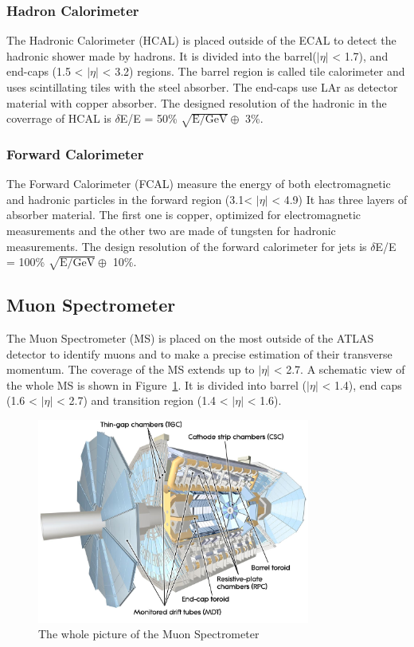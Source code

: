 \subsubsection{Hadron Calorimeter}
The Hadronic Calorimeter (HCAL) is placed outside of the ECAL to detect the hadronic shower made by hadrons.
It is divided into the barrel($|\eta|$ < 1.7), and end-caps (1.5 < $|\eta|$ < 3.2) regions. 
The barrel region is called tile calorimeter and uses scintillating tiles with the steel absorber. 
The end-caps use LAr as detector material with copper absorber. 
The designed resolution of the hadronic in the coverrage of HCAL is $\delta$E/E = 50\% $\sqrt{\mathrm{E/GeV}} \oplus$ 3\%.

\subsubsection{Forward Calorimeter}
The Forward Calorimeter (FCAL) measure the energy of both electromagnetic and hadronic particles in the forward region (3.1< $|\eta|$ < 4.9)
It has three layers of absorber material. The first one is copper, optimized for electromagnetic measurements and the other two are made of tungsten for hadronic measurements. 
The design resolution of the forward calorimeter for jets is $\delta$E/E = 100\% $\sqrt{\mathrm{E/GeV}} \oplus$ 10\%.

\subsection{Muon Spectrometer}
The Muon Spectrometer (MS) is placed on the most outside of the ATLAS detector to identify muons and to make a precise estimation of their transverse momentum.
The coverage of the MS extends up to $|\eta|$ < 2.7. A schematic view of the whole MS is shown in Figure~\ref{fig:MS}.
It is divided into  barrel ($|\eta|$ < 1.4), end caps (1.6 < $|\eta|$ < 2.7) and
transition region (1.4 < $|\eta|$ < 1.6).

\begin{figure}[tbp]
\begin{center}
 \includegraphics[width=0.8\textwidth,keepaspectratio]{figures/detector/MS}
\caption{
The whole picture of the Muon Spectrometer
}
\label{fig:MS}
\end{center}
\end{figure}

